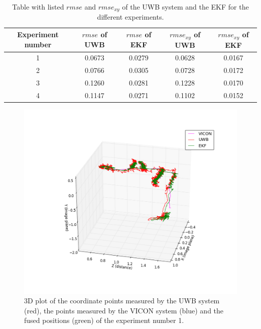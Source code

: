 \begin{table}[ht!]
\begin{center}
\begin{tabular}{c|c|c|c|c}
	Experiment number & $\textit{rmse}$ of \ac{UWB} & $\textit{rmse}$ of \ac{EKF} & $\textit{rmse}_{xy}$ of \ac{UWB} & $\textit{rmse}_{xy}$ of \ac{EKF}\\ 
	\hline 
	1 & 0.0673 & 0.0279 & 0.0628 & 0.0167 \\
	2 & 0.0766 & 0.0305 & 0.0728 & 0.0172 \\
	3 & 0.1260 & 0.0281 & 0.1228 & 0.0170 \\
	4 & 0.1147 & 0.0271 & 0.1102 & 0.0152
\end{tabular}
\end{center}
\caption{Table with listed $\textit{rmse}$ and $\textit{rmse}_{xy}$ of the \ac{UWB} system and the \ac{EKF} for the different experiments.}
\label{tab:results}
\end{table}

\begin{figure}[ht!]\centering
	\includegraphics[width=1.0\textwidth]{figures/evaluation}
	\caption{3D plot of the coordinate points measured by the \ac{UWB} system (red), the points measured by the VICON system (blue) and the fused positions (green) of the experiment number 1.}\label{fig:evaluation}
\end{figure}
